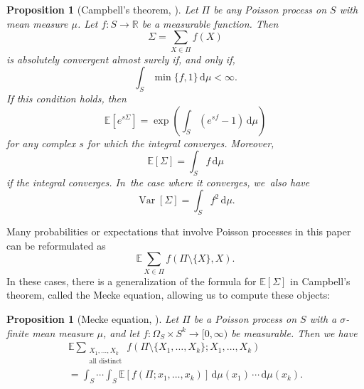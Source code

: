 \documentclass[JEP,XML,SOM,Unicode,published]{cedram}
\newcommand{\RR}{\mathbb{R}}
\newcommand{\EE}{\mathbb{E}}
\newcommand{\riemint}[4]{\int_{#1}^{#2}\! #3 \, \mathrm{d}#4}
\DeclareMathOperator{\vard}{Var}
\theoremstyle{plain}
\newtheorem{prop}[cor]{Proposition}
\theoremstyle{definition}
\begin{document}
\begin{prop}[Campbell's theorem, {\cite[\S3.2]{Kingman93}}]
\label{prel:campbell}
Let $\Pi$ be any Poisson process on $S$ with mean measure $\mu$. Let $f\colon S \to \RR$ be a measurable function. Then
\[
\Sigma = \sum_{X \in \Pi} f(X)
\]
is absolutely convergent almost surely if, and only if,
\[
\riemint{S}{}{\min\{f, 1\}}{\mu} < \infty.
\]
If this condition holds, then
\[
\EE[e^{s\Sigma}] = \exp\left(\riemint{S}{}{(e^{sf} - 1)}{\mu}\right)
\]
for any complex $s$ for which the integral converges. Moreover,
\[
\EE[\Sigma] = \riemint{S}{}{f}{\mu}
\]
if the integral converges. In~the case where it converges, we~also have
\[
\vard[\Sigma] = \riemint{S}{}{f^2}{\mu}.
\]
\end{prop}

Many probabilities or expectations that involve Poisson processes in this paper can be reformulated as
\[
\EE \sum_{X \in \Pi} f(\Pi\setminus \{X\}, X).
\]
In these cases, there is a generalization of the formula for $\EE[\Sigma]$ in Campbell's theorem, called the Mecke equation, allowing us to compute these objects:

\begin{prop}[Mecke equation, {\cite[Th.\,4.5]{LastPenrose18}}]
\label{prel:mecke}
Let $\Pi$ be a Poisson process on $S$ with a $\sigma$-finite mean measure $\mu$, and let $f: \Omega_S \times S^k \to [0, \infty)$ be measurable. Then we have
\begin{multline*}
\EE \sum_{\substack{X_1, \ldots, X_k \\ \text{all distinct}}} f(\Pi\setminus \{X_1, \ldots, X_k\}; X_1, \ldots, X_k) \\[-10pt]
= \int_S \cdots \int_S \EE[f(\Pi; x_1, \ldots, x_k)] \, \mathrm d\mu(x_1)\, \cdots\, \mathrm d\mu(x_k).
\end{multline*}
\end{prop}



\end{document}
